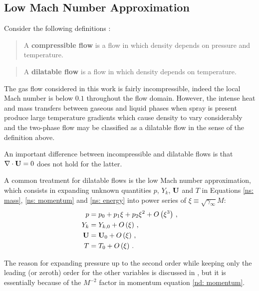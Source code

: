 \subsection{Low Mach Number Approximation}
Consider the following definitions \cite{viozat1997implicit}:

\begin{quote}
A \textbf{compressible flow} is a flow in which density depends on pressure and
temperature.
\end{quote}

\begin{quote}
A \textbf{dilatable flow} is a flow in which density depends on temperature.
\end{quote}

The gas flow considered in this work is fairly incompressible, indeed the
local Mach number is below $0.1$ throughout the flow domain. However, the
intense heat and mass transfers between gaseous and liquid phases when
spray is present produce large temperature gradients which cause density to vary
considerably and the two-phase flow may be classified as a dilatable flow in the
sense of the definition above.

An important difference between incompressible and dilatable flows is
that $\nabla \cdot \mathbf{U} = 0$ does not hold for the latter. 

A common treatment for dilatable flows is the low Mach number approximation, which consists in expanding unknown quantities $p$, $Y_k$, $\mathbf{U}$ and $T$ in Equations \eqref{ns:
mass}, \eqref{ns: momentum} and \eqref{ns: energy} into power series
of $\xi \equiv \sqrt{\gamma_{\infty}} M$:
\begin{subequations}\label{eq: expansion}
 \begin{align}
   p &= p_{0} + p_{1}\xi + p_{2}\xi^2 + O\left( \xi^3 \right) \, ,\\
   Y_k &= Y_{k,0} + O\left( \xi \right) \, ,\\
  \mathbf{U} &= \mathbf{U}_{0} + O\left( \xi \right) \, ,\\
  T &= T_{0} + O\left( \xi \right) \, .
 \end{align}
\end{subequations}

The reason for expanding pressure up to the second order while keeping only the
leading (or zeroth) order for the other variables is discussed in
\cite{muller1999low}, but it is essentially because of the $M^{-2}$ factor in momentum equation \eqref{nd: momentum}. 

